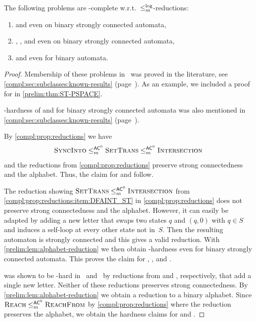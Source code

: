 \begin{theorem}\label{prelim:thm:binary_pspace_problems} The following problems are \PSPACE-complete w.r.t.~$\le_m^{\log}$-reductions:
	\begin{enumerate}
		\item \SFS and \SIS even on binary strongly connected  automata,
		\item \DFAINT, \ST, and \DST even on binary strongly connected  automata,
		\item \REACH and \REACHF even for binary automata.
	\end{enumerate}
\end{theorem}
\begin{proof}
	Membership of these problems in \PSPACE\ was 
	proved in the literature, see  \cref{compl:sec:subclasses:known-results} (page~\pageref{prelim:classes:intro:SFS}).
	As an example, we included a proof
	for \ST in \cref{prelim:thm:ST-PSPACE}.
	
	\PSPACE-hardness of \SFS and \SIS for binary strongly connected automata
	was also mentioned  in \cref{compl:sec:subclasses:known-results} (page~\pageref{prelim:classes:intro:SFS}).
	
	By \cref{compl:prop:reductions} we have
	\[
	\textsc{\sc Sync\-Into} \le_m^{\textup{\textsf{AC}}^0} \textsc{\sc Set\-Trans} \le_m^{\textup{\textsf{AC}}^0} \text{\sc Intersection}
	\]
	and the reductions from \cref{compl:prop:reductions}
	preserve strong connectedness and the alphabet.
	Thus, the claim for \ST and \DFAINT follow.
	
	The reduction showing $\textsc{\sc Set\-Trans} \le_m^{\textup{\textsf{AC}}^0} \text{\sc Intersection}$
	from \cref{compl:prop:reductions:item:DFAINT_ST} in \cref{compl:prop:reductions}
	does not preserve strong connectedness and the alphabet.
	However, it can easily be adapted 
	by adding a new letter that swaps two states $q$ and $(q,0)$ 
	with $q \in S$
	and induces a self-loop at every other state not in~$S$.
	Then the resulting automaton is strongly connected
	and this gives a valid reduction.
	With \cref{prelim:lem:alphabet-reduction} 
	we then obtain \PSPACE-hardness
	even for binary strongly connected automata.
	This proves the claim for \DFAINT, \ST, and \DST.
	
	\REACH was shown to be \PSPACE-hard
	in~\cite[Thm.~3.2]{Rys83}
	and~\cite[Thm.~3]{BondarV16}
	by reductions from  
	\SIS and \DFAINT, respectively,
	that add a single new letter.
	Neither of these reductions preserves strong connectedness.
	By \cref{prelim:lem:alphabet-reduction}	we obtain a reduction 
	to a binary alphabet.
	Since $\text{\sc Reach} \le_m^{\textup{\textsf{AC}}^0} \text{\sc ReachFrom}$
	by \cref{compl:prop:reductions}
	where the reduction preserves the alphabet,
	we obtain the hardness claims for \REACH and \REACHF.
\end{proof}
